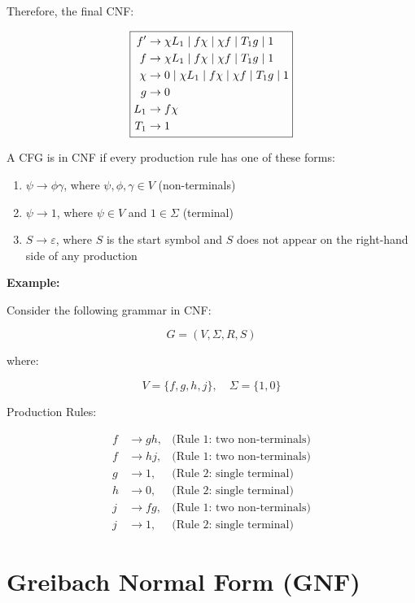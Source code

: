 \documentclass[12pt,a4paper,openany]{article}
\begin{document}
\begin{enumerate}
    Therefore, the final CNF:

    \[
    \fbox{$
    \begin{aligned}
        f' &\to \chi L_1 \mid f\chi \mid \chi f \mid T_1 g \mid 1 \\
        f  &\to \chi L_1 \mid f\chi \mid \chi f \mid T_1 g \mid 1 \\
        \chi  &\to 0 \mid \chi L_1 \mid f\chi \mid \chi f \mid T_1 g \mid 1 \\
        g  &\to 0 \\
        L_1   &\to f\chi \\
        T_1   &\to 1
    \end{aligned}
    $}
    \]

\end{enumerate}

A CFG is in CNF if every production rule has one of these forms:

\begin{enumerate}
    \item $\psi \to \phi \gamma$, where $\psi, \phi, \gamma \in V$ (non-terminals)
    \item $\psi \to 1$, where $\psi \in V$ and $1 \in \Sigma$ (terminal)
    \item $S \to \varepsilon$, where $S$ is the start symbol and $S$ does not appear on the right-hand side of any production
\end{enumerate}

\textbf{Example:}

Consider the following grammar in CNF:

$$G = (V, \Sigma, R, S)$$

where:

\[V = \{f, g, h, j\}, \quad  \Sigma = \{1, 0\} \]

Production Rules:

\begin{align*}
    f &\to g h,  &\text{(Rule 1: two non-terminals)} \\
    f &\to h j,  &\text{(Rule 1: two non-terminals)} \\
    g &\to 1,  &\text{(Rule 2: single terminal)} \\
    h &\to 0, &\text{(Rule 2: single terminal)} \\
    j &\to f g, &\text{(Rule 1: two non-terminals)} \\
    j &\to 1, &\text{(Rule 2: single terminal)}
\end{align*}

\section{Greibach Normal Form (GNF)}
\end{document}

